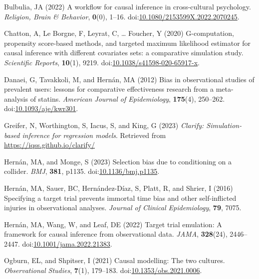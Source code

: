 \documentclass[
  singlecolumn]{article}
\newlength{\cslhangindent}
\newlength{\cslentryspacingunit} %
\newenvironment{CSLReferences}[2] %
 {%
  \setlength{\parindent}{0pt}
  \ifodd #1
  \let\oldpar\par
  \def\par{\hangindent=\cslhangindent\oldpar}
  \fi
  \setlength{\parskip}{#2\cslentryspacingunit}
 }%
 {}
\begin{document}
\hypertarget{refs}{}
\begin{CSLReferences}{1}{0}
\leavevmode{}%
Bulbulia, JA (2022) A workflow for causal inference in cross-cultural
psychology. \emph{Religion, Brain \& Behavior}, \textbf{0}(0), 1--16.
doi:\href{https://doi.org/10.1080/2153599X.2022.2070245}{10.1080/2153599X.2022.2070245}.

\leavevmode{}%
Chatton, A, Le Borgne, F, Leyrat, C, \ldots{} Foucher, Y (2020)
G-computation, propensity score-based methods, and targeted maximum
likelihood estimator for causal inference with different covariates
sets: a comparative simulation study. \emph{Scientific Reports},
\textbf{10}(1), 9219.
doi:\href{https://doi.org/10.1038/s41598-020-65917-x}{10.1038/s41598-020-65917-x}.

\leavevmode{}%
Danaei, G, Tavakkoli, M, and Hernán, MA (2012) Bias in observational
studies of prevalent users: lessons for comparative effectiveness
research from a meta-analysis of statins. \emph{American Journal of
Epidemiology}, \textbf{175}(4), 250--262.
doi:\href{https://doi.org/10.1093/aje/kwr301}{10.1093/aje/kwr301}.

\leavevmode{}%
Greifer, N, Worthington, S, Iacus, S, and King, G (2023) \emph{Clarify:
Simulation-based inference for regression models}. Retrieved from
\url{https://iqss.github.io/clarify/}

\leavevmode{}%
Hernán, MA, and Monge, S (2023) Selection bias due to conditioning on a
collider. \emph{BMJ}, \textbf{381}, p1135.
doi:\href{https://doi.org/10.1136/bmj.p1135}{10.1136/bmj.p1135}.

\leavevmode{}%
Hernán, MA, Sauer, BC, Hernández-Díaz, S, Platt, R, and Shrier, I (2016)
Specifying a target trial prevents immortal time bias and other
self-inflicted injuries in observational analyses. \emph{Journal of
Clinical Epidemiology}, \textbf{79}, 7075.

\leavevmode{}%
Hernán, MA, Wang, W, and Leaf, DE (2022) Target trial emulation: A
framework for causal inference from observational data. \emph{JAMA},
\textbf{328}(24), 2446--2447.
doi:\href{https://doi.org/10.1001/jama.2022.21383}{10.1001/jama.2022.21383}.

\leavevmode{}%
Ogburn, EL, and Shpitser, I (2021) Causal modelling: The two cultures.
\emph{Observational Studies}, \textbf{7}(1), 179--183.
doi:\href{https://doi.org/10.1353/obs.2021.0006}{10.1353/obs.2021.0006}.


\end{CSLReferences}
\end{document}
